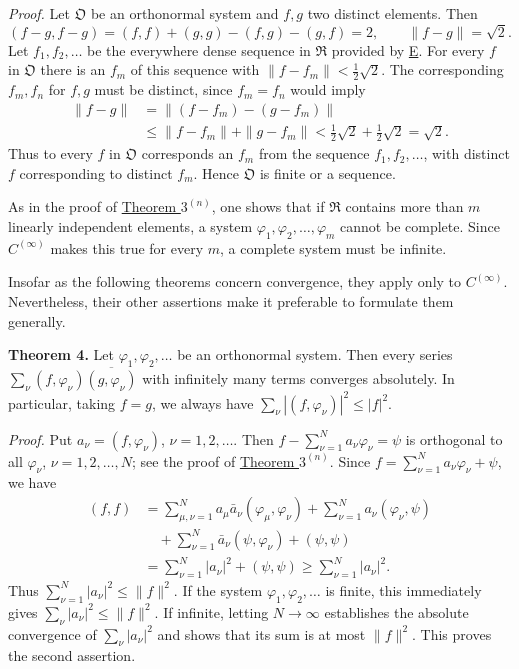 \documentclass[fontsize=13pt,twoside,openany,headings=normal,parskip=false,bookmarkpackage=false,DIV=calc]{scrbook}
\begin{document}
\emph{Proof.} Let $\mathfrak{O}$ be an orthonormal system and $f,g$ two distinct elements. Then
\[
(f-g,f-g)=(f,f)+(g,g)-(f,g)-(g,f)=2,
\qquad \|f-g\|=\sqrt2.
\]
Let $f_1,f_2,\ldots$ be the everywhere dense sequence in $\mathfrak{R}$ provided by \hyperref[ax:II.E]{E}. For every $f$ in $\mathfrak{O}$ there is an $f_m$ of this sequence with $\|f-f_m\|<\frac12\sqrt2$. The corresponding $f_m,f_n$ for $f,g$ must be distinct, since $f_m=f_n$ would imply
\begin{align*}
\|f-g\|&=\|(f-f_m)-(g-f_m)\|\\
&\leq\|f-f_m\|+\|g-f_m\|
<\tfrac12\sqrt2+\tfrac12\sqrt2=\sqrt2.
\end{align*}
Thus to every $f$ in $\mathfrak{O}$ corresponds an $f_m$ from the sequence $f_1,f_2,\ldots$, with distinct $f$ corresponding to distinct $f_m$. Hence $\mathfrak{O}$ is finite or a sequence.

As in the proof of \hyperref[thm:II.3n]{Theorem $3^{(n)}$}, one shows that if $\mathfrak{R}$ contains more than $m$ linearly independent elements, a system $\varphi_1,\varphi_2,\ldots,\varphi_m$ cannot be complete. Since \hyperref[ax:II.Cinfty]{$C^{(\infty)}$} makes this true for every $m$, a complete system must be infinite.

Insofar as the following theorems concern convergence, they apply only to \hyperref[ax:II.Cinfty]{$C^{(\infty)}$}. Nevertheless, their other assertions make it preferable to formulate them generally.

\leavevmode{}\textbf{Theorem 4.}\label{thm:II.4} Let $\varphi_1,\varphi_2,\ldots$ be an orthonormal system. Then every series $\sum_\nu(f,\varphi_\nu)\overline{(g,\varphi_\nu)}$ with infinitely many terms converges absolutely. In particular, taking $f=g$, we always have $\sum_\nu|(f,\varphi_\nu)|^2\leq|f|^2$.

\emph{Proof.} Put $a_\nu=(f,\varphi_\nu)$, $\nu=1,2,\ldots$. Then $f-\sum_{\nu=1}^Na_\nu\varphi_\nu=\psi$ is orthogonal to all $\varphi_\nu$, $\nu=1,2,\ldots,N$; see the proof of \hyperref[thm:II.3n]{Theorem $3^{(n)}$}.
\hypertarget{origpage-27}{}%
Since $f=\sum_{\nu=1}^Na_\nu\varphi_\nu+\psi$, we have
\begin{align*}
(f,f)&=\sum_{\mu,\nu=1}^Na_\mu\bar a_\nu(\varphi_\mu,\varphi_\nu)
+\sum_{\nu=1}^Na_\nu(\varphi_\nu,\psi)\\
&\quad+\sum_{\nu=1}^N\bar a_\nu(\psi,\varphi_\nu)+(\psi,\psi)\\
&=\sum_{\nu=1}^N|a_\nu|^2+(\psi,\psi)
\geq\sum_{\nu=1}^N|a_\nu|^2.
\end{align*}
Thus $\sum_{\nu=1}^N|a_\nu|^2\leq\|f\|^2$. If the system $\varphi_1,\varphi_2,\ldots$ is finite, this immediately gives $\sum_\nu|a_\nu|^2\leq\|f\|^2$. If infinite, letting $N\to\infty$ establishes the absolute convergence of $\sum_\nu|a_\nu|^2$ and shows that its sum is at most $\|f\|^2$. This proves the second assertion.
\end{document}
